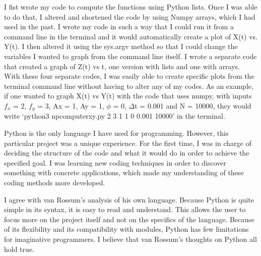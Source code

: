 \documentclass{article}
\begin{document}
I fist wrote my code to compute the functions using Python lists. Once I was able to do that, I altered and shortened the code by using Numpy arrays, which I had used in the past. I wrote my code in such a way that I could run it from a command line in the terminal and it would automatically create a plot of X(t) vs. Y(t). I then altered it using the sys.argv method so that I could change the variables I wanted to graph from the command line itself. I wrote a separate code that created a graph of Z(t) vs t, one version with lists and one with arrays. With these four separate codes, I was easily able to create specific plots from the terminal command line without having to alter any of my codes. As an example, if one wanted to graph X(t) vs Y(t) with the code that uses numpy, with inputs $f_x$ = 2, $f_y$ = 3, Ax = 1, Ay = 1, $\phi$ = 0, $\Delta$t = 0.001 and N = 10000, they would write `python3 npcomputerxy.py 2 3 1 1 0 0.001 10000' in the terminal. 

Python is the only language I have used for programming. However, this particular project was a unique experience. For the first time, I was in charge of deciding the structure of the code and what it would do in order to achieve the specified goal. I was learning new coding techniques in order to discover something with concrete applications, which made my understanding of these coding methods more developed. 

I agree with van Rossum's analysis of his own language. Because Python is quite simple in its syntax, it is easy to read and understand. This allows the user to focus more on the project itself and not on the specifics of the language. Because of its flexibility and its compatibility with modules, Python has few limitations for imaginative programmers. I believe that van Rossum's thoughts on Python all hold true. 
\end{document}

